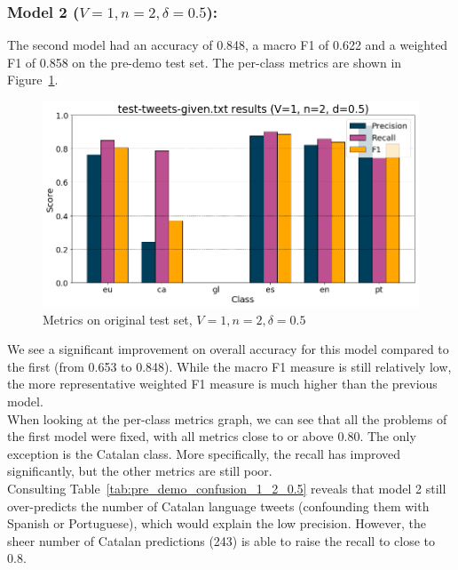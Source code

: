 \documentclass[runningheads]{llncs}
\begin{document}
\subsubsection{Model 2 ($V=1, n=2, \delta=0.5$): }
The second model had an accuracy of 0.848, a macro F1 of 0.622 and a weighted F1 of 0.858 on the pre-demo test set. The per-class metrics are shown in Figure~\ref{fig:pre_demo_1_2_0.5}.

\begin{figure}
    \begin{center}
        \includegraphics[width=12.5cm]{images/test_tweets_given_results_1_2_0-5.png}
        \caption{Metrics on original test set, $V=1, n=2, \delta=0.5$}
        \label{fig:pre_demo_1_2_0.5}
    \end{center}
\end{figure}

We see a significant improvement on overall accuracy for this model compared to the first (from 0.653 to 0.848). While the macro F1 measure is still relatively low, the more representative weighted F1 measure is much higher than the previous model. \\

When looking at the per-class metrics graph, we can see that all the problems of the first model were fixed, with all metrics close to or above 0.80. The only exception is the Catalan class. More specifically, the recall has improved significantly, but the other metrics are still poor. \\

Consulting Table~\ref{tab:pre_demo_confusion_1_2_0.5} reveals that model 2 still over-predicts the number of Catalan language tweets (confounding them with Spanish or Portuguese), which would explain the low precision. However, the sheer number of Catalan predictions (243) is able to raise the recall to close to 0.8. \\
\end{document}
